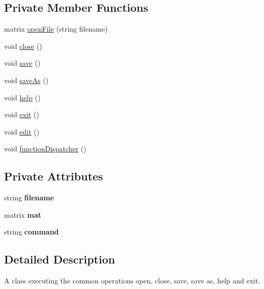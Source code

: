 \subsection*{Private Member Functions}
\begin{DoxyCompactItemize}
\item 
matrix \hyperlink{class_application_ab2f161414a4e2f16e28321c192051006}{open\+File} (string filename)
\item 
void \hyperlink{class_application_a5a7dcf61b6701a2b2665c78e4e074e73}{close} ()
\item 
void \hyperlink{class_application_a2cbf94e01d55a814de35f90f4d874647}{save} ()
\item 
void \hyperlink{class_application_a10d5a48c95593cee25c1b9e0e257b5a7}{save\+As} ()
\item 
void \hyperlink{class_application_a2c6518d7f121299d9be8c66d31997fbc}{help} ()
\item 
void \hyperlink{class_application_a3c8a98d6c10a5b054800488df16cdbcb}{exit} ()
\item 
void \hyperlink{class_application_a4b193bf9c8be7105e89a2323ea77b1f4}{edit} ()
\item 
void \hyperlink{class_application_a00241f0a09c32b0ef3cb1f068475cc50}{function\+Dispatcher} ()
\end{DoxyCompactItemize}
\subsection*{Private Attributes}
\begin{DoxyCompactItemize}
\item 
\mbox{\label{class_application_a3a20c3178562a91be951369d3356aabd}} 
string {\bfseries filename}
\item 
\mbox{\label{class_application_ae126cc1a7d1f29ad485ddd285dadf3a3}} 
matrix {\bfseries mat}
\item 
\mbox{\label{class_application_acffe56e592fb525ce14ad0437c2c3d34}} 
string {\bfseries command}
\end{DoxyCompactItemize}


\subsection{Detailed Description}
A class executing the common operations open, close, save, save as, help and exit. 


